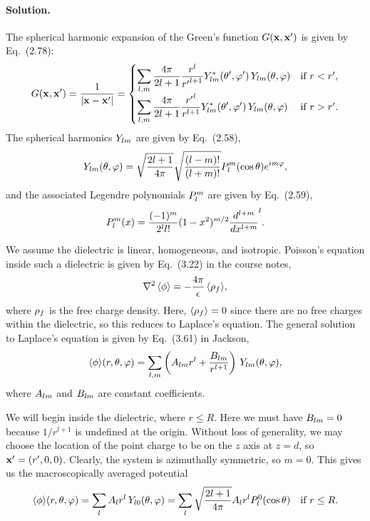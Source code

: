 \documentclass[11pt]{article}
\newcommand{\beq}{\begin{equation*}}
\newcommand{\eeq}{\end{equation*}}
\newcommand{\beqn}{\begin{equation}}
\newcommand{\eeqn}{\end{equation}}
\newenvironment{solution}
{
    \paragraph{Solution.}
    \ignorespaces
}
{
    \bigskip
}
\begin{document}
\begin{solution}
	The spherical harmonic expansion of the Green's function $G(\vb{x}, \vb{x}')$ is given by Eq.~(2.78):
	\beqn \label{greenexp}
		\Gxxp = \frac{1}{\abs{\vx - \vx'}}
		= \begin{cases}
			\dsum_{l,m} \dfrac{4\pi}{2l + 1} \dfrac{r^l}{{r'}^{l + 1}} \Ylm^*\tvp \, \Ylm\tv & \tif r < r', \\[2ex]
			\dsum_{l,m} \dfrac{4\pi}{2l + 1} \dfrac{{r'}^l}{r^{l + 1}} \Ylm^*\tvp \, \Ylm\tv & \tif r > r'.
		\end{cases}
	\eeqn
	The spherical harmonics $Y_{l m}$ are given by Eq.~(2.58),
	\beq
		\Ylm\tv = \sqrt{\frac{2l + 1}{4\pi}} \sqrt{\frac{(l - m)!}{(l + m)!}} \Plm(\cost) e^{i m \vph},
	\eeq
	and the associated Legendre polynomials $P_l^m$ are given by Eq.~(2.59),
	\beq
		\Plm(x) = \frac{(-1)^m}{2^l l!} (1 - x^2)^{m/2} \dv[l + m]{}{x} (x^2 - 1)^l.
	\eeq	
	
	We assume the dielectric is linear, homogeneous, and isotropic.  Poisson's equation inside such a dielectric is given by Eq.~(3.22) in the course notes,
	\beq
		\lap\evphi = -\frac{4\pi}{\eps} \evrhof\!,
	\eeq
	where $\rho_f$ is the free charge density.  Here, $\evrhof = 0$ since there are no free charges within the dielectric, so this reduces to Laplace's equation.  The general solution to Laplace's equation is given by Eq.~(3.61) in Jackson,
	\beqn \label{lapsol}
		\evphi\!(r, \tht, \vph) = \sum_{l,m} \left( \Alm r^l + \frac{\Blm}{r^{l+1}} \right) \, \Ylm\tv,
	\eeqn
	where $A_{l m}$ and $B_{l m}$ are constant coefficients.
	
	We will begin inside the dielectric, where $r \leq R$.  Here we must have $B_{l m} = 0$ because $1/r^{l+1}$ is undefined at the origin.  Without loss of generality, we may choose the location of the point charge to be on the $z$ axis at $z = d$, so $\vb{x}' = (r', 0, 0)$.  Clearly, the system is azimuthally symmetric, so $m = 0$.  This gives us the macroscopically averaged potential
	\beqn \label{inside}
		\evphi\!(r, \tht, \vph) = \sum_{l} \Al r^l \, Y_{l 0}\tv
		= \sum_{l} \sqrt{\frac{2l + 1}{4\pi}} \Al r^l \Ploct \quad \tif r \leq R.
	\eeqn
	

\end{solution}
\end{document}
